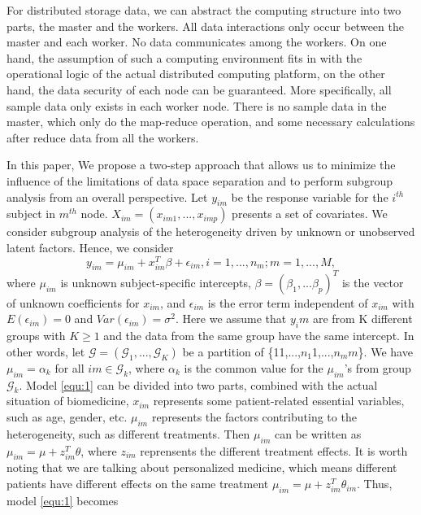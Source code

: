 \documentclass[review]{elsarticle}
\begin{document}
For distributed storage data, we can abstract the computing structure into two parts, the master and the workers. All data interactions only occur between the master and each worker. No data communicates among the workers. On one hand, the assumption of such a computing environment fits in with the operational logic of the actual distributed computing platform, on the other hand, the data security of each node can be guaranteed. More specifically, all sample data only exists in each worker node. There is no sample data in the master, which only do the map-reduce operation, and some necessary calculations after reduce data from all the workers.

In this paper, We propose a two-step approach that allows us to minimize the influence of the limitations of data space separation and to perform subgroup analysis from an overall perspective. Let $y_{im}$ be the response variable for the $i^{th}$ subject in $m^{th}$ node. $X_{im}=(x_{im1},...,x_{imp})$ presents a set of covariates. We consider subgroup analysis of the heterogeneity driven by unknown or unobserved latent factors. Hence, we consider
\begin{equation}
y_{im} = \mu_{im} + x_{im}^T\beta + \epsilon_{im}, i=1,...,n_m; m=1,...,M,
\label{equ:1}
\end{equation}
where $\mu_{im}$ is unknown subject-specific intercepts, $\beta = (\beta_1,...\beta_p)^T$ is the vector of unknown coefficients for $x_{im}$, and $\epsilon_{im}$ is the error term independent of $x_{im}$ with $E(\epsilon_{im})=0$ and $Var(\epsilon_{im})=\sigma^2$. Here we assume that $y_im$ are from K different groups with $K\geq 1$ and the data from the same group have the same intercept. In other words, let $\mathcal{G}=(\mathcal{G}_1,...,\mathcal{G}_K)$ be a partition of \{11,...,$n_1$1,...,$n_mm$\}. We have $\mu_{im}=\alpha_k$ for all $im\in \mathcal{G}_k$, where $\alpha_k$ is the common value for the $\mu_{im}$'s from group $\mathcal{G}_k$. Model \ref{equ:1} can be divided into two parts, combined with the actual situation of biomedicine, $x_{im}$ represents some patient-related essential variables, such as age, gender, etc. $\mu_{im}$ represents the factors contributing to the heterogeneity, such as different treatments. Then $\mu_{im}$ can be written as $\mu_{im}=\mu+z_{im}^T\theta$, where $z_{im}$ reprensents the different treatment effects. It is worth noting that we are talking about personalized medicine, which means different patients have different effects on the same treatment $\mu_{im}=\mu+z_{im}^T\theta_{im}$. Thus, model \ref{equ:1} becomes
\end{document}
